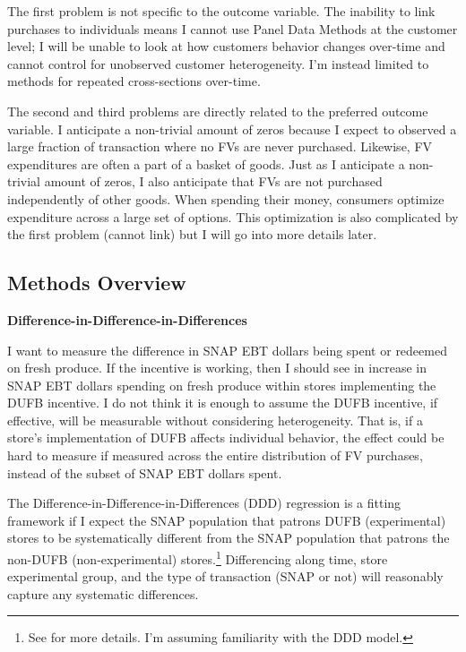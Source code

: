 \documentclass[12pt,letterpaperpaper,]{book}
\begin{document}
The first problem is not specific to the outcome variable. The inability
to link purchases to individuals means I cannot use Panel Data Methods
at the customer level; I will be unable to look at how customers
behavior changes over-time and cannot control for unobserved customer
heterogeneity. I'm instead limited to methods for repeated
cross-sections over-time.

The second and third problems are directly related to the preferred
outcome variable. I anticipate a non-trivial amount of zeros because I
expect to observed a large fraction of transaction where no FVs are
never purchased. Likewise, FV expenditures are often a part of a basket
of goods. Just as I anticipate a non-trivial amount of zeros, I also
anticipate that FVs are not purchased independently of other goods. When
spending their money, consumers optimize expenditure across a large set
of options. This optimization is also complicated by the first problem
(cannot link) but I will go into more details later.

\subsection*{Methods Overview}\label{methods-overview}

\textbf{Difference-in-Difference-in-Differences}

I want to measure the difference in SNAP EBT dollars being spent or
redeemed on fresh produce. If the incentive is working, then I should
see in increase in SNAP EBT dollars spending on fresh produce within
stores implementing the DUFB incentive. I do not think it is enough to
assume the DUFB incentive, if effective, will be measurable without
considering heterogeneity. That is, if a store's implementation of DUFB
affects individual behavior, the effect could be hard to measure if
measured across the entire distribution of FV purchases, instead of the
subset of SNAP EBT dollars spent.

The Difference-in-Difference-in-Differences (DDD) regression is a
fitting framework if I expect the SNAP population that patrons DUFB
(experimental) stores to be systematically different from the SNAP
population that patrons the non-DUFB (non-experimental)
stores.\footnote{See \citet{wooldridge_econometric_2010} for more
  details. I'm assuming familiarity with the DDD model.} Differencing
along time, store experimental group, and the type of transaction (SNAP
or not) will reasonably capture any systematic differences.
\end{document}
